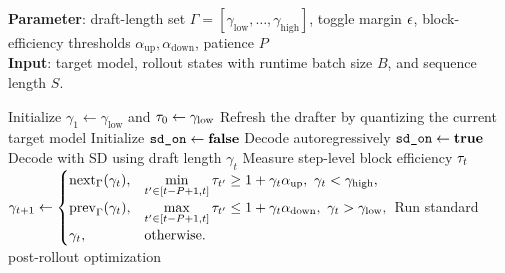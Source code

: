 \begin{algorithm}[t]
\caption{\methodtitle{} Pipeline}
\label{alg:full-pipeline}
{\textbf{Parameter}:} draft-length set $\Gamma=[\gamma_{\mathrm{low}},\dots,\gamma_{\mathrm{high}}]$, toggle margin $\epsilon$, block-efficiency thresholds $\alpha_{\mathrm{up}},\alpha_{\mathrm{down}}$, patience $P$\\
{\textbf{Input}:} target model, rollout states with runtime batch size $B$, and sequence length $S$.
\begin{algorithmic}[1]
\State Initialize $\gamma_1 \gets \gamma_{\mathrm{low}}$ and $\tau_0 \gets \gamma_{\mathrm{low}}$
    \State Refresh the drafter by quantizing the current target model
    \State Initialize $\texttt{sd\_on} \gets \textbf{false}$
            \State Decode autoregressively
            \State $\texttt{sd\_on} \gets \textbf{true}$
        \Else
            \State Decode with SD using draft length $\gamma_t$
        \EndIf
    \EndWhile
    \State Measure step-level block efficiency $\tau_t$
    \State $\gamma_{t+1} \gets
    \begin{cases}
    \mathrm{next}_{\Gamma}(\gamma_t),
    & \min\limits_{t' \in [t-P+1,t]} \tau_{t'} \ge 1+\gamma_t\alpha_{\mathrm{up}},\ \gamma_t<\gamma_{\mathrm{high}}, \\
    \mathrm{prev}_{\Gamma}(\gamma_t),
    & \max\limits_{t' \in [t-P+1,t]} \tau_{t'} \le 1+\gamma_t\alpha_{\mathrm{down}},\ \gamma_t>\gamma_{\mathrm{low}}, \\
    \gamma_t,
    & \text{otherwise.}
    \end{cases}$
    \State Run standard post-rollout optimization
\EndFor
\end{algorithmic}
\end{algorithm}

